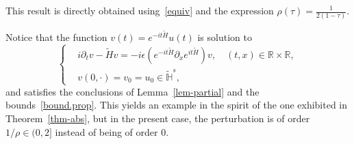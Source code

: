 \documentclass[AHL,Unicode,published]{cedram}
\newcommand{\R}{\mathbb{R}}
\newcommand{\HH}{\mathbb{H}}
\newcommand*\eps{\epsilon}
\newcommand{\wt}{\widetilde}
\newcommand{\<}{\langle}
\renewcommand{\>}{\rangle}
\newcommand{\R}{\mathbb{R}}
\begin{document}
This result is directly obtained using~\eqref{equiv} and the expression $\rho(\tau)=\frac1{2(1-\tau)}$.

\begin{rema}\label{remchgt}
Notice that the function $v(t)=e^{-it \wt{H}}u(t)$ is solution to
\[
\begin{cases}
&i\partial_t v-\wt{H}v=-i \eps \left(e^{-it \wt{H}} \partial_x e^{it \wt{H}}\right)v, \quad (t,x)\in \R\times \R,\\
&v(0, \cdot)= v_0=u_0 \in \widetilde{\HH}^{s},
\end{cases}
\]
and satisfies the conclusions of Lemma~\ref{lem-partial} and the bounds~\eqref{bound.prop}. This yields an example in the spirit of the one exhibited in Theorem~\ref{thm-abs}, but in the present case, the perturbation is of order~$1/\rho \in (0,2]$ instead of being of order 0.
\end{rema}
\end{document}
